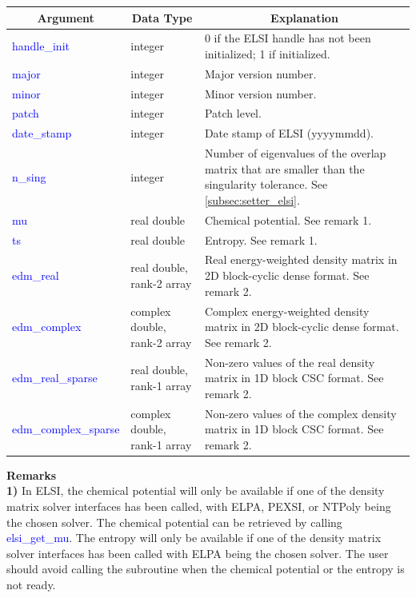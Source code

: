 \documentclass{report}
\begin{document}
\begin{tabular}[]{|p{30mm}|p{45mm}|p{90mm}|}
\hline
\multicolumn{1}{|c|}{\textbf{Argument}} & \multicolumn{1}{c|}{\textbf{Data Type}} & \multicolumn{1}{c|}{\textbf{Explanation}}\\
\hline
\textcolor{blue}{handle\_init}         & integer                      & 0 if the ELSI handle has not been initialized; 1 if initialized.\\
\hline
\textcolor{blue}{major}                & integer                      & Major version number.\\
\hline
\textcolor{blue}{minor}                & integer                      & Minor version number.\\
\hline
\textcolor{blue}{patch}                & integer                      & Patch level.\\
\hline
\textcolor{blue}{date\_stamp}          & integer                      & Date stamp of ELSI (yyyymmdd).\\
\hline
\textcolor{blue}{n\_sing}              & integer                      & Number of eigenvalues of the overlap matrix that are smaller than the singularity tolerance.  See \ref{subsec:setter_elsi}.\\
\hline
\textcolor{blue}{mu}                   & real double                  & Chemical potential.  See remark 1.\\
\hline
\textcolor{blue}{ts}                   & real double                  & Entropy.  See remark 1.\\
\hline
\textcolor{blue}{edm\_real}            & real double, rank-2 array    & Real energy-weighted density matrix in 2D block-cyclic dense format.  See remark 2.\\
\hline
\textcolor{blue}{edm\_complex}         & complex double, rank-2 array & Complex energy-weighted density matrix in 2D block-cyclic dense format.  See remark 2.\\
\hline
\textcolor{blue}{edm\_real\_sparse}    & real double, rank-1 array    & Non-zero values of the real density matrix in 1D block CSC format.  See remark 2.\\
\hline
\textcolor{blue}{edm\_complex\_sparse} & complex double, rank-1 array & Non-zero values of the complex density matrix in 1D block CSC format.  See remark 2.\\
\hline
\end{tabular}

\bigskip
\textbf{Remarks}\\

\textbf{1)} In ELSI, the chemical potential will only be available if one of the density matrix solver interfaces has been called, with ELPA, PEXSI, or NTPoly being the chosen solver.  The chemical potential can be retrieved by calling \textcolor{blue}{elsi\_get\_mu}.  The entropy will only be available if one of the density matrix solver interfaces has been called with ELPA being the chosen solver.  The user should avoid calling the subroutine when the chemical potential or the entropy is not ready.\\
\end{document}
